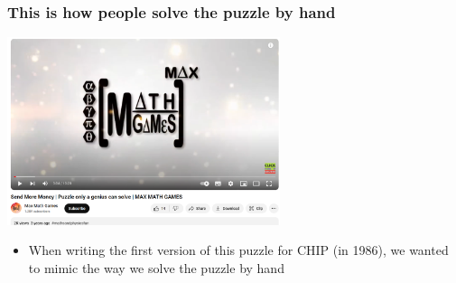 \begin{frame}
\frametitle{This is how people solve the puzzle by hand}
\label{sendmore:not an expert}
\href{https://www.youtube.com/watch?v=zLUCWsEeEg8}{\includegraphics[width=8cm]{../sendmore/images/maxmathgames}}

\begin{itemize}
\item When writing the first version of this puzzle for CHIP (in 1986), we wanted to mimic the way we solve the puzzle by hand
\end{itemize}

\end{frame}




